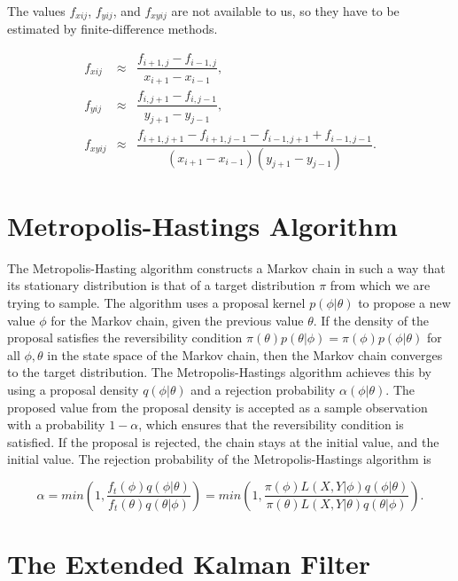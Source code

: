 The values $f_{xij}$, $f_{yij}$, and $f_{xyij}$ are not available to us, so they have to be estimated by finite-difference methods. 


$$
\begin{array}{rcl}
    f_{xij} & \approx & \dfrac{f_{i+1,j} - f_{i-1,j}}{x_{i+1} - x_{i-1}},  \\
    f_{yij} & \approx & \dfrac{f_{i,j+1} - f_{i,j-1}}{y_{j+1} - y_{j-1}}, \\
    f_{xyij} & \approx & \dfrac{f_{i+1,j+1} - f_{i+1,j-1} - f_{i-1,j+1} + f_{i-1,j-1}}{(x_{i+1} - x_{i-1})(y_{j+1} - y_{j-1})}.
\end{array}
$$


\parencite{choudhary_bicubic_2018}

\section{Metropolis-Hastings Algorithm}


The Metropolis-Hasting algorithm constructs a Markov chain in such a way that its stationary distribution is that of a target distribution $\pi$ from which we are trying to sample. The algorithm uses a proposal kernel $p(\phi | \theta)$ to propose a new value $\phi$ for the Markov chain, given the previous value $\theta$. If the density of the proposal satisfies the reversibility condition $\pi(\theta) p(\theta|\phi) = \pi(\phi) p(\phi|\theta)$ for all $\phi,\theta$ in the state space of the Markov chain, then the Markov chain converges to the target distribution. The Metropolis-Hastings algorithm achieves this by using a proposal density $q(\phi|\theta)$ and a rejection probability $\alpha(\phi|\theta)$. The proposed value from the proposal density is accepted as a sample observation with a probability $1-\alpha$, which ensures that the reversibility condition is satisfied. If the proposal is rejected, the chain stays at the initial value, and the initial value. The rejection probability of the Metropolis-Hastings algorithm is

$$
    \alpha = min \left( 1, \frac{f_t(\phi)q(\phi|\theta)}{f_t(\theta)q(\theta|\phi)} \right) = min \left( 1, \frac{\pi(\phi)L(X,Y|\phi)q(\phi|\theta)}{\pi(\theta)L(X,Y|\theta)q(\theta|\phi)} \right).
$$

\parencite{gamerman2006mcmc}
\section{The Extended Kalman Filter}
\label{sec: EKF}

